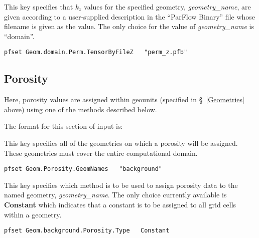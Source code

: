 {
This key specifies that $k_z$ values for the specified geometry,
{\em geometry\_name}, are given according to a user-supplied description
in the ``ParFlow Binary'' file whose filename is given as the value.
The only choice for the value of {\em geometry\_name} is ``domain''.
}
\begin{display}\begin{verbatim}
pfset Geom.domain.Perm.TensorByFileZ   "perm_z.pfb"
\end{verbatim}\end{display}




\subsection{Porosity}
\label{Porosity}

Here, porosity values are assigned within geounits (specified in
\S~\ref{Geometries} above) using one of the methods described below.

The format for this section of input is:

{
This key specifies all of the geometries on which a porosity will be
assigned.  These geometries must cover the entire computational domain.
}
\begin{display}\begin{verbatim}
pfset Geom.Porosity.GeomNames   "background"
\end{verbatim}\end{display}

{
This key specifies which method is to be used to assign porosity data
to the named geometry, {\em geometry\_name}.  The only choice currently
available is {\bf Constant} which indicates that a constant is to be
assigned to all grid cells within a geometry.
}
\begin{display}\begin{verbatim}
pfset Geom.background.Porosity.Type   Constant
\end{verbatim}\end{display}

